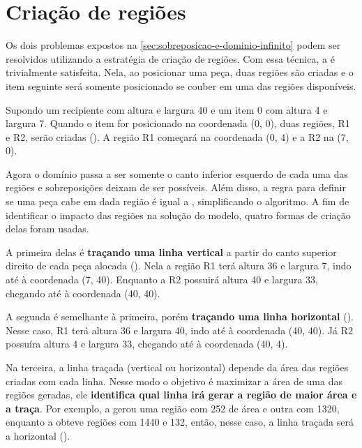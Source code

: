 \section{Criação de regiões}\label{sec:criacao-de-regioes}

Os dois problemas expostos na \cref{sec:sobreposicao-e-dominio-infinito} podem ser
resolvidos utilizando a estratégia de criação de regiões.
Com essa técnica, a  é trivialmente satisfeita.
Nela, ao posicionar uma peça, duas regiões são criadas e o item
seguinte será somente posicionado se couber em uma das regiões disponíveis.

Supondo um recipiente com altura e largura 40 e um item 0 com altura 4 e largura 7.
Quando o item for posicionado na coordenada (0, 0), duas regiões, R1 e R2, serão criadas
().
A região R1 começará na coordenada (0, 4) e a R2 na (7, 0).



Agora o domínio passa a ser somente o canto inferior esquerdo de cada uma das regiões e
sobreposições deixam de ser possíveis.
Além disso, a regra para definir se uma peça cabe em dada região é igual a ,
simplificando o algoritmo.
A fim de identificar o impacto das regiões na solução do modelo, quatro formas de criação
delas foram usadas.

A primeira delas é \textbf{traçando uma linha vertical} a partir do canto superior direito de cada
peça alocada ().
Nela a região R1 terá altura 36 e largura 7, indo até à coordenada (7, 40).
Enquanto a R2 possuirá altura 40 e largura 33, chegando até à coordenada (40, 40).

A segunda é semelhante à primeira, porém \textbf{traçando uma linha horizontal}
().
Nesse caso, R1 terá altura 36 e largura 40, indo até à coordenada (40, 40).
Já R2 possuíra altura 4 e largura 33, chegando até à coordenada (40, 4).



Na terceira, a linha traçada (vertical ou horizontal) depende da área das regiões criadas
com cada linha.
Nesse modo o objetivo é maximizar a área de uma das regiões geradas, ele \textbf{identifica qual
linha irá gerar a região de maior área e a traça}.
Por exemplo, a  gerou uma região com 252 de área e outra com 1320,
enquanto a  obteve regiões com 1440 e 132, então, nesse caso, a linha
traçada será a horizontal ().

